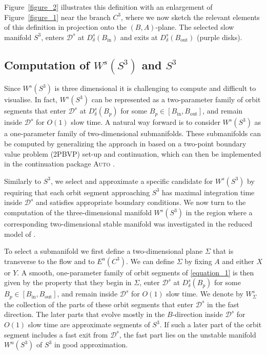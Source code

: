 \documentclass{ws-ijbc}
\begin{document}
Figure~\ref{figure_2} illustrates this definition with an enlargement of Figure~\ref{figure_1} near the branch $C^3$, where we now sketch the relevant elements of this definition in projection onto the $(B,A)$-plane. The selected slow manifold $S^3$, enters $\mathscr{D}^s$ at $D^s_\delta(B_{\mathrm{in}})$ and exits at $D^s_\delta(B_{\mathrm{out}})$ (purple disks).


\subsection{Computation of $W^{s}(S^3)$ and  $S^3$}
\label{sec:compWsS3}

Since $W^{s}(S^3)$ is three dimensional it is challenging to compute and difficult to visualise.  In fact, $W^{s}(S^3)$ can be represented as a two-parameter family of orbit segments that enter $\mathscr{D}^s$ at $D^s_{\delta}(B_p)$ for some $B_p \in [B_{\text{in}}, B_{\text{out}}]$, and remain inside $\mathscr{D}^s$ for $O(1)$ slow time.  A natural way forward is to consider $W^{s}(S^3)$ as a one-parameter family of two-dimensional submanifolds.  These submanifolds can be computed by generalizing the approach in \cite{Saeed_Paper} based on a two-point boundary value problem (2PBVP) set-up and continuation, which can then be implemented in the continuation package \textsc{Auto} \cite{autoOriginal, auto}.  

Similarly to $S^3$, we select and approximate a specific candidate for $W^{s}(S^3)$ by requiring that each orbit segment approaching $S^3$ has maximal integration time inside $\mathscr{D}^s$ and satisfies appropriate boundary conditions.  We now turn to the computation of the three-dimensional manifold $W^{s}(S^3)$ in the region where a corresponding two-dimensional stable manifold was investigated in the reduced model of \cite{QSSA}.

To select a submanifold we first define a two-dimensional plane $\Sigma$ that is transverse to the flow and to $E^u(C^3)$.  We can define $\Sigma$ by fixing $A$ and either $X$ or $Y$.  A smooth, one-parameter family of orbit segments of \eqref{equation_1} is then given by the property that they begin in $\Sigma$, enter $\mathscr{D}^s$ at $D^s_{\delta}(B_p)$ for some $B_p \in [B_{\text{in}}, B_{\text{out}}]$, and remain inside $\mathscr{D}^s$ for $O(1)$ slow time.  We denote by $W^{s}_{\Sigma}$ the collection of the parts of these orbit segments that enter $\mathscr{D}^s$ in the fast direction.  The later parts that evolve mostly in the $B$-direction inside $\mathscr{D}^s$ for $O(1)$ slow time are approximate segments of $S^3$.  If such a later part of the orbit segment includes a fast exit from $\mathscr{D}^s$, the fast part lies on the unstable manifold $W^{u}(S^3)$ of $S^3$ in good approximation.
\end{document}
